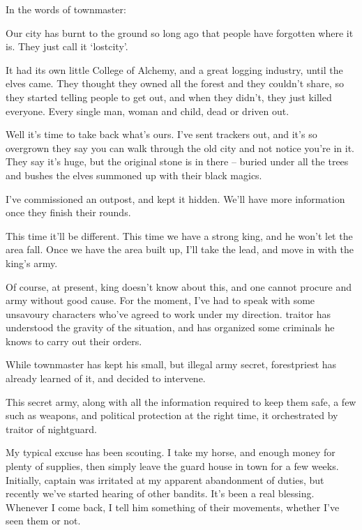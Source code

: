 \begin{multicols}{2}
\label{expanding_wilderness}

\noindent
In the words of \gls{townmaster}:

\begin{exampletext}

	Our city has burnt to the ground so long ago that people have forgotten where it is.
	They just call it `\gls{lostcity}'.

	It had its own little College of Alchemy, and a great logging industry, until the elves came.
	They thought they owned all the forest and they couldn't share, so they started telling people to get out, and when they didn't, they just killed everyone.
	Every single man, woman and child, dead or driven out.

	Well it's time to take back what's ours.
	I've sent trackers out, and it's so overgrown they say you can walk through the old city and not notice you're in it.
	They say it's huge, but the original stone is in there -- buried under all the trees and bushes the elves summoned up with their black magics.

	I've commissioned an outpost, and kept it hidden.
	We'll have more information once they finish their rounds.

	This time it'll be different.
	This time we have a strong king, and he won't let the area fall.
	Once we have the area built up, I'll take the lead, and move in with the king's army.

	Of course, at present, \gls{king} doesn't know about this, and one cannot procure and army without good cause.
	For the moment, I've had to speak with some unsavoury characters who've agreed to work under my direction.
	\Gls{traitor} has understood the gravity of the situation, and has organized some criminals he knows to carry out their orders.

\end{exampletext}

While \gls{townmaster} has kept his small, but illegal army secret, \gls{forestpriest} has already learned of it, and decided to intervene.

This secret army, along with all the information required to keep them safe, a few such as weapons, and political protection at the right time, it orchestrated by \gls{traitor} of \gls{nightguard}.

\begin{exampletext}

	My typical excuse has been scouting.
	I take my horse, and enough money for plenty of supplies, then simply leave the guard house in town for a few weeks.
	Initially, \gls{captain} was irritated at my apparent abandonment of duties, but recently we've started hearing of other bandits.
	It's been a real blessing.
	Whenever I come back, I tell him something of their movements, whether I've seen them or not.


\end{exampletext}
\end{multicols}
